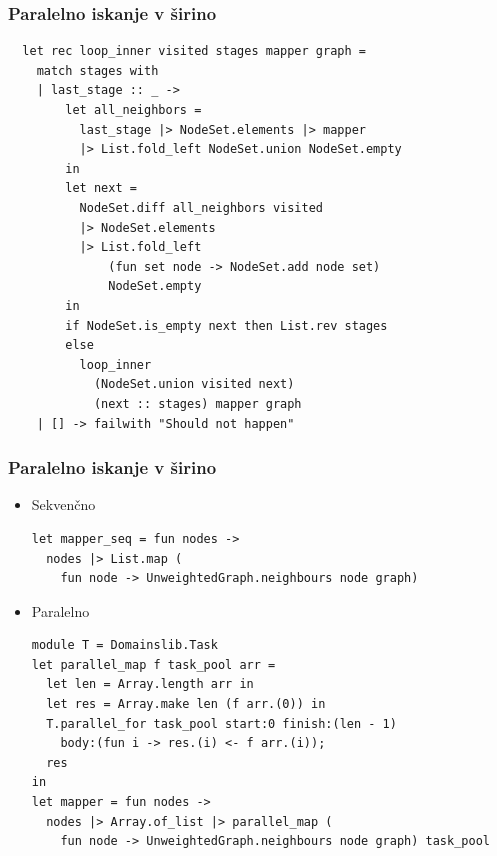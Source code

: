 \documentclass{beamer}
\begin{document}
\begin{frame}[fragile]
  \frametitle{Paralelno iskanje v širino}

  \begin{verbatim}
  let rec loop_inner visited stages mapper graph =
    match stages with
    | last_stage :: _ ->
        let all_neighbors =
          last_stage |> NodeSet.elements |> mapper
          |> List.fold_left NodeSet.union NodeSet.empty
        in
        let next =
          NodeSet.diff all_neighbors visited
          |> NodeSet.elements
          |> List.fold_left
              (fun set node -> NodeSet.add node set)
              NodeSet.empty
        in
        if NodeSet.is_empty next then List.rev stages
        else
          loop_inner
            (NodeSet.union visited next)
            (next :: stages) mapper graph
    | [] -> failwith "Should not happen"

  \end{verbatim}
\end{frame}

\begin{frame}[fragile]
  \frametitle{Paralelno iskanje v širino}

\begin{itemize}
  \item Sekvenčno
  \begin{verbatim}
let mapper_seq = fun nodes -> 
  nodes |> List.map (
    fun node -> UnweightedGraph.neighbours node graph)
  \end{verbatim}
  \item Paralelno
  \begin{verbatim}
module T = Domainslib.Task
let parallel_map f task_pool arr =
  let len = Array.length arr in
  let res = Array.make len (f arr.(0)) in
  T.parallel_for task_pool start:0 finish:(len - 1) 
    body:(fun i -> res.(i) <- f arr.(i));
  res
in
let mapper = fun nodes ->
  nodes |> Array.of_list |> parallel_map (
    fun node -> UnweightedGraph.neighbours node graph) task_pool
  \end{verbatim}
\end{itemize}
  
\end{frame}
\end{document}
